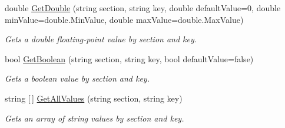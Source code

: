 \begin{DoxyCompactItemize}
double \mbox{\hyperlink{classpic_library_1_1_i_n_ifile_ae18550990a9197dcc8e9dbe2b6f87e40}{Get\+Double}} (string section, string key, double default\+Value=0, double min\+Value=double.\+Min\+Value, double max\+Value=double.\+Max\+Value)
\begin{DoxyCompactList}\small\item\em Gets a double floating-\/point value by section and key. \end{DoxyCompactList}\item 
bool \mbox{\hyperlink{classpic_library_1_1_i_n_ifile_acec60d423b48f84c12b0e07259a00549}{Get\+Boolean}} (string section, string key, bool default\+Value=false)
\begin{DoxyCompactList}\small\item\em Gets a boolean value by section and key. \end{DoxyCompactList}\item 
string \mbox{[}$\,$\mbox{]} \mbox{\hyperlink{classpic_library_1_1_i_n_ifile_a841f8111aed3cef3de338c393d8e0ee5}{Get\+All\+Values}} (string section, string key)
\begin{DoxyCompactList}\small\item\em Gets an array of string values by section and key. \end{DoxyCompactList}\end{DoxyCompactItemize}
